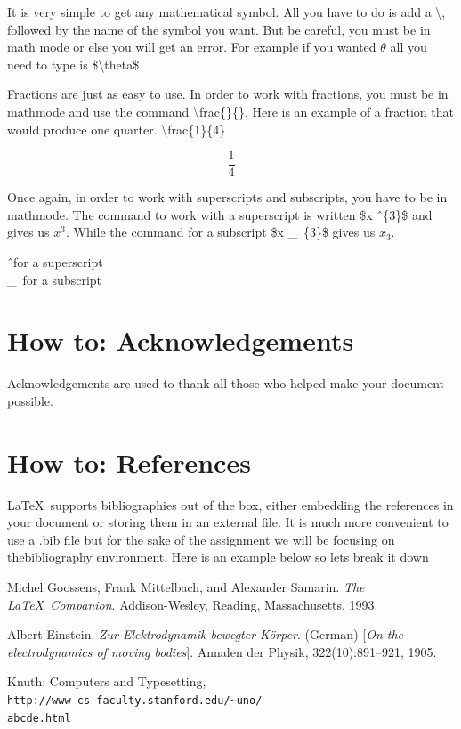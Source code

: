\documentclass[12pt,journal,compsoc]{IEEEtran}
\begin{document}
It is very simple to get any mathematical symbol. All you have to do is add a \textbackslash, followed by the name of the symbol you want. But be careful, you must be in math mode or else you will get an error. For example if you wanted $\theta$ all you need to type is \$\textbackslash{theta\$} \par
Fractions are just as easy to use. In order to work with fractions, you must be in mathmode and use the command \textbackslash{frac\{\}\{\}}. Here is an example of a fraction that would produce one quarter. \textbackslash{frac\{1\}\{4\}}
\begin{center}
\begin{equation}
     \frac{1}{4}
\end{equation}
\end{center} \par
Once again, in order to work with superscripts and subscripts, you have to be in mathmode. The command to work with a superscript is written \$x \^\ \{3\}\$ and gives us $x^{3}$. While the command for a subscript \$x \_\ \{3\}\$ gives us $x_{3}$. 
\begin{center}
    \^\ for a superscript \\
    \_\ for a subscript 
\end{center}



\section{How to: Acknowledgements}
Acknowledgements are used to thank all those who helped make your document possible.



\section{How to: References}
\LaTeX\ supports bibliographies out of the box, either embedding the references in your document or storing them in an external file. It is much more convenient to use a .bib file but for the sake of the assignment we will be focusing on thebibliography environment. Here is an example below so lets break it down

\begin{thebibliography}{9}
Michel Goossens, Frank Mittelbach, and Alexander Samarin. 
\textit{The \LaTeX\ Companion}. 
Addison-Wesley, Reading, Massachusetts, 1993.

Albert Einstein. 
\textit{Zur Elektrodynamik bewegter K{\"o}rper}. (German) 
[\textit{On the electrodynamics of moving bodies}]. 
Annalen der Physik, 322(10):891–921, 1905.

Knuth: Computers and Typesetting,\\\texttt{http://www-cs-faculty.stanford.edu/\~{}uno/ \\abcde.html}
\end{thebibliography} 
\end{document}

